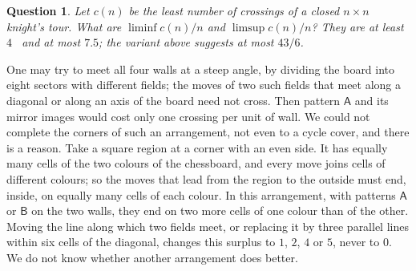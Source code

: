 \documentclass[11pt]{amsart}
\newtheorem{question}[theorem]{Question}
\theoremstyle{remark}
\begin{document}
\begin{question}
Let $c(n)$ be the least number of crossings of a closed $n\times n$ knight's tour. What are
$\liminf c(n)/n$ and $\limsup c(n)/n$? They are at least $4$~\cite{besa} and at most $7.5$; the variant above
suggests at most $43/6$.
\end{question}
One may try to meet all four walls at a steep angle, by dividing the board into eight sectors with different fields;
the moves of two such fields that meet along a diagonal or along an axis of the board need not cross. Then pattern
$\mathsf A$ and its mirror images would cost only one crossing per unit of wall. We could not complete the corners
of such an arrangement, not even to a cycle cover, and there is a reason. Take a square region at a corner with an
even side. It has equally many cells of the two colours of the chessboard, and every move joins cells of different
colours; so the moves that lead from the region to the outside must end, inside, on equally many cells of each
colour. In this arrangement, with patterns $\mathsf A$ or $\mathsf B$ on the two walls, they end on two more cells of
one colour than of the other. Moving the line along which two fields meet, or replacing it by three parallel lines
within six cells of the diagonal, changes this surplus to $1$, $2$, $4$ or $5$, never to $0$. We do not know whether
another arrangement does better.
\end{document}
